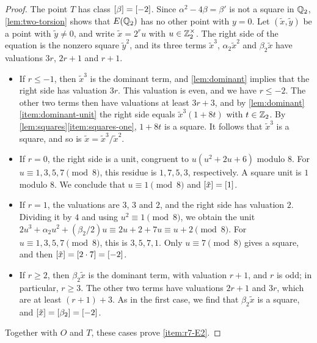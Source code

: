 \begin{proof}
The point $T$ has class $[\beta]=[-2]$. Since $\alpha^2-4\beta=\beta'$
is not a square in $\mathbb Q_2$, \cref{lem:two-torsion} shows that $E(\mathbb Q_2)$ has
no other point with $y=0$. Let $(\tilde x,\tilde y)$ be a point with $\tilde y\ne0$, and write
$\tilde x=2^ru$ with $u\in\mathbb Z_2^\times$. The right side of the equation is the
nonzero square $\tilde y^2$, and its three terms $\tilde x^3$, $\alpha_2\tilde x^2$ and
$\beta_2\tilde x$ have valuations $3r$, $2r+1$ and $r+1$.
\begin{itemize}
\item If $r\le-1$, then $\tilde x^3$ is the dominant term, and
\cref{lem:dominant} implies that the right side has valuation $3r$. This
valuation is even, and we have $r\le-2$. The other two terms then have
valuations at least $3r+3$, and by \cref{lem:dominant}\ref{item:dominant-unit}
the right side equals $\tilde x^3(1+8t)$ with $t\in\mathbb Z_2$. By
\cref{lem:squares}\ref{item:squares-one}, $1+8t$ is a square. It follows that
$\tilde x^3$ is a square, and so is $\tilde x=\tilde x^3/\tilde x^2$.
\item If $r=0$, the right side is a unit, congruent to $u(u^2+2u+6)$
modulo $8$. For $u\equiv1,3,5,7\pmod8$, this residue is $1,7,5,3$,
respectively. A square unit is $1$ modulo $8$. We conclude that $u\equiv1\pmod8$
and $[\tilde x]=[1]$.
\item If $r=1$, the valuations are $3$, $3$ and $2$, and the right side has
valuation $2$. Dividing it by $4$ and using $u^2\equiv1\pmod8$, we obtain
the unit $2u^3+\alpha_2u^2+(\beta_2/2)u\equiv2u+2+7u\equiv u+2\pmod8$. For
$u\equiv1,3,5,7\pmod8$, this is $3,5,7,1$. Only $u\equiv7\pmod8$ gives a
square, and then $[\tilde x]=[2\cdot7]=[-2]$.
\item If $r\ge2$, then $\beta_2\tilde x$ is the dominant term, with valuation
$r+1$, and $r$ is odd; in particular, $r\ge3$. The other two terms have
valuations $2r+1$ and $3r$, which are at least $(r+1)+3$. As in the first
case, we find that $\beta_2\tilde x$ is a square, and $[\tilde x]=[\beta_2]=[-2]$.
\end{itemize}
Together with $O$ and $T$, these cases prove \ref{item:r7-E2}.


\end{proof}
